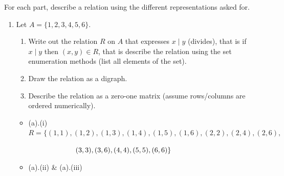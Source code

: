\begin{questions}
\begin{solution}
\end{solution}




 For each part, describe a relation using the different representations asked for. 

\begin{enumerate}[label=(\alph*),itemsep=1pt,parsep=0pt,
        topsep=0pt,partopsep=0pt]
    \item Let $A = \{1, 2, 3, 4, 5, 6 \}$.  
    \begin{enumerate}[label=(\roman*)]
    	\item  Write out the relation $R$ on $A$ that expresses $x\;|\;y$ (divides), that is if $x \;|\; y$ then $(x, y) \in R$, that is describe the relation using the set enumeration methods (list all elements of the set).  
    	\item  Draw the relation as a digraph. 
    	\item  Describe the relation as a zero-one matrix (assume rows/columns are ordered numerically). 
    \end{enumerate}
    \ifprintanswers 
		\vspace{-10pt}
	\fi 
    \begin{solution}
    	\begin{itemize}
			\item[] (a).(i) $R = \{ (1, 1), (1, 2), (1, 3), (1, 4), (1, 5), (1, 6), (2, 2), (2, 4), (2, 6),$

			$\hspace{0.9in} (3, 3), (3, 6), (4, 4), (5, 5), (6, 6)   \}$
			\item[] (a).(ii) \& (a).(iii)
			 
		\end{itemize}
    \end{solution}


\end{enumerate}
\end{questions}
